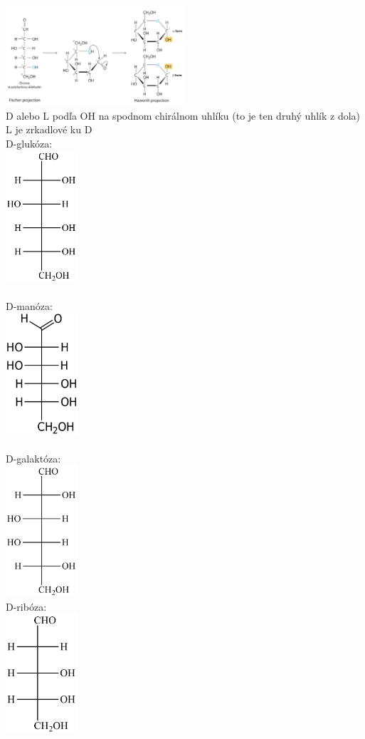 \includegraphics[width=0.5\textwidth]{images/biochemia/fischer_to_haworth_sacharidy}
\\
D alebo L podľa OH na spodnom chirálnom uhlíku (to je ten druhý uhlík z dola)\\
L je zrkadlové ku D\\
\tab D-glukóza:\\
\includegraphics[width=0.2\textwidth]{images/biochemia/glucose}\\
\\
\tab D-manóza:\\
\includegraphics[width=0.2\textwidth]{images/biochemia/mannose}\\
\\
\tab D-galaktóza:\\
\includegraphics[width=0.2\textwidth]{images/biochemia/galactose}\\
\tab D-ribóza:\\
\includegraphics[width=0.2\textwidth]{images/biochemia/ribose}\\
